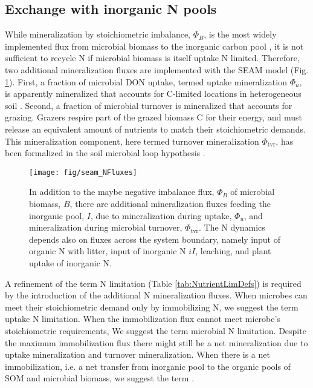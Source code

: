 \subsection{Exchange with inorganic N pools}

While mineralization by stoichiometric imbalance, $\Phi_B$, is the most widely
implemented flux from microbial biomass to the inorganic carbon pool
\citep{Manzoni09}, it is not sufficient to recycle N if microbial biomass is
itself uptake N limited. Therefore, two additional mineralization fluxes are
implemented with the SEAM model (Fig. \ref{fig:SEAMStructNFluxes}). First, a
fraction of microbial DON uptake, termed uptake mineralization $\Phi_u$, is
apparently mineralized that accounts for C-limited locations in heterogeneous
soil \citep{Manzoni08}.
Second, a fraction of microbial turnover is mineralized that accounts for
grazing. Grazers respire part of the grazed biomass C for their energy, and
must release an equivalent amount of nutrients to match their stoichiometric
demands. This mineralization component, here termed turnover mineralization
$\Phi_{\operatorname{tvr}}$, has been formalized in the soil microbial loop
hypothesis \citep{Clarholm85, Raynaud06}.

\begin{figure}[t] \vspace*{2mm}
\begin{center}
\texttt{[image: fig/seam\_NFluxes]} 
\end{center}
\caption{
In addition to the maybe negative imbalance flux, $\Phi_B$ of microbial biomass,
$B$, there are additional mineralization fluxes feeding the inorganic pool, $I$,
due to mineralization during uptake, $\Phi_u$, and mineralization during
microbial turnover, $\Phi_{\operatorname{tvr}}$. The N dynamics depends also on
fluxes across the system boundary, namely input of organic N with litter, input
of inorganic N $iI$, leaching, and plant uptake of inorganic N.
\label{fig:SEAMStructNFluxes}}
\end{figure}

A refinement of the term N limitation (Table \ref{tab:NutrientLimDefs}) is
required by the introduction of the additional N mineralization fluxes.
When microbes can meet their stoichiometric demand only by immobilizing
 N, we suggest the term uptake N limitation.
When the immobilization flux cannot meet microbe's stoichiometric requirements,
We suggest the term microbial N limitation. Despite the maximum immobilization
flux there might still be a net mineralization due to uptake mineralization and
turnover mineralization.
When there is a net immobilization, i.e. a net transfer from inorganic pool to
the organic pools of SOM and microbial biomass, we suggest the term .

